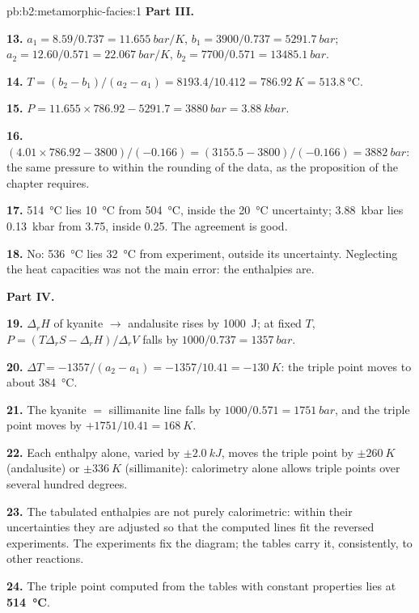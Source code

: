 \begin{solution}{pb:b2:metamorphic-facies:1}
\noindent\textbf{Part III.}

\textbf{13.} $a_1 = 8.59/0.737 = \qty{11.655}{bar/K}$, $b_1 = 3900/0.737 =
\qty{5291.7}{bar}$; $a_2 = 12.60/0.571 = \qty{22.067}{bar/K}$, $b_2 = 7700/0.571 =
\qty{13485.1}{bar}$.

\textbf{14.} $T = (b_2 - b_1)/(a_2 - a_1) = 8193.4/10.412 = \qty{786.92}{K} =
\qty{513.8}{\celsius}$.

\textbf{15.} $P = 11.655\times786.92 - 5291.7 = \qty{3880}{bar} = \qty{3.88}{kbar}$.

\textbf{16.} $(4.01\times786.92 - 3800)/(-0.166) = (3155.5 - 3800)/(-0.166) =
\qty{3882}{bar}$: the same pressure to within the rounding of the data, as the proposition of the chapter requires.

\textbf{17.} \qty{514}{\celsius} lies \qty{10}{\celsius} from \qty{504}{\celsius}, inside
the \qty{20}{\celsius} uncertainty; \qty{3.88}{kbar} lies \qty{0.13}{kbar} from 3.75,
inside 0.25. The agreement is good.

\textbf{18.} No: \qty{536}{\celsius} lies \qty{32}{\celsius} from experiment, outside its
uncertainty. Neglecting the heat capacities was not the main error: the enthalpies are.

\noindent\textbf{Part IV.}

\textbf{19.} $\Delta_r H$ of kyanite $\to$ andalusite rises by \qty{1000}{J}; at fixed
$T$, $P = (T\Delta_r S - \Delta_r H)/\Delta_r V$ falls by $1000/0.737 = \qty{1357}{bar}$.

\textbf{20.} $\Delta T = -1357/(a_2 - a_1) = -1357/10.41 = \qty{-130}{K}$: the triple point
moves to about \qty{384}{\celsius}.

\textbf{21.} The kyanite $=$ sillimanite line falls by $1000/0.571 = \qty{1751}{bar}$, and
the triple point moves by $+1751/10.41 = \qty{+168}{K}$.

\textbf{22.} Each enthalpy alone, varied by $\pm\qty{2.0}{kJ}$, moves the triple point by
$\pm\qty{260}{K}$ (andalusite) or $\pm\qty{336}{K}$ (sillimanite): calorimetry alone allows
triple points over several hundred degrees.

\textbf{23.} The tabulated enthalpies are not purely calorimetric: within their
uncertainties they are adjusted so that the computed lines fit the reversed experiments.
The experiments fix the diagram; the tables carry it, consistently, to other reactions.

\textbf{24.} The triple point computed from the tables with constant properties lies at
\textbf{\qty[text-series-to-math=true]{514}{\celsius}}.
\end{solution}
